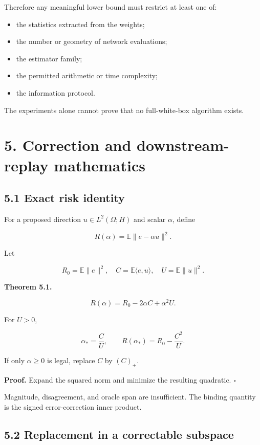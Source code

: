 \documentclass[
  10pt,
]{article}
\providecommand{\tightlist}{%
  \setlength{\itemsep}{0pt}\setlength{\parskip}{0pt}}
\begin{document}
Therefore any meaningful lower bound must restrict at least one of:

\begin{itemize}
\tightlist
\item
  the statistics extracted from the weights;
\item
  the number or geometry of network evaluations;
\item
  the estimator family;
\item
  the permitted arithmetic or time complexity;
\item
  the information protocol.
\end{itemize}

The experiments alone cannot prove that no full-white-box algorithm
exists.

\section{5. Correction and downstream-replay
mathematics}\label{correction-and-downstream-replay-mathematics}

\subsection{5.1 Exact risk identity}\label{exact-risk-identity}

For a proposed direction \(u\in L^2(\Omega;H)\) and scalar \(\alpha\),
define

\[
R(\alpha)=\mathbb E\|e-\alpha u\|^2.
\]

Let

\[
R_0=\mathbb E\|e\|^2,
\quad
C=\mathbb E\langle e,u\rangle,
\quad
U=\mathbb E\|u\|^2.
\]

\textbf{Theorem 5.1.}

\[
R(\alpha)=R_0-2\alpha C+\alpha^2U.
\]

For \(U>0\),

\[
\alpha_*=\frac CU,
\qquad
R(\alpha_*)=R_0-\frac{C^2}{U}.
\]

If only \(\alpha\ge0\) is legal, replace \(C\) by \((C)_+\).

\textbf{Proof.} Expand the squared norm and minimize the resulting
quadratic. \(\square\)

Magnitude, disagreement, and oracle span are insufficient. The binding
quantity is the signed error-correction inner product.

\subsection{5.2 Replacement in a correctable
subspace}\label{replacement-in-a-correctable-subspace}
\end{document}
